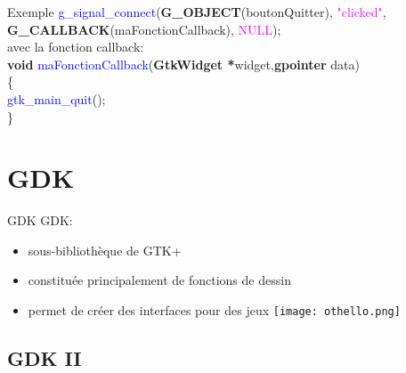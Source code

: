 \documentclass{beamer}
\begin{document}
\begin{frame}{Exemple}
    \textcolor{blue}{g\_signal\_connect}(\textbf{G\_OBJECT}(boutonQuitter), \textcolor{magenta}{"clicked"},\\
    \hspace{3cm}\textbf{G\_CALLBACK}(maFonctionCallback), \textcolor{magenta}{NULL});\\
    \vspace{0.2cm}
    avec la fonction callback:\\
    \vspace{0.1cm}
    \textbf{void} \textcolor{blue}{maFonctionCallback}(\textbf{GtkWidget *}widget,\textbf{gpointer} data)\\
    \{\\
    \hspace{0.7cm}\textcolor{blue}{gtk\_main\_quit}();\\
    \}\\
\end{frame}

\section{GDK}

\begin{frame}{GDK}
    GDK:
    \begin{itemize}
    \item sous-bibliothèque de GTK+
    \item constituée principalement de fonctions de dessin
    \item permet de créer des interfaces pour des jeux
    \texttt{[image: othello.png]}
    \end{itemize}
\end{frame}

\subsection{GDK II}
\end{document}
